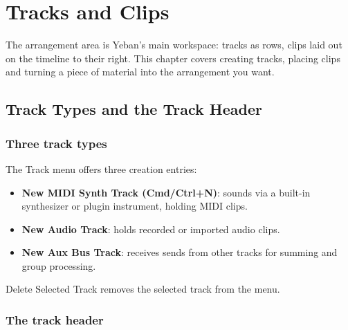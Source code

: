 
\chapter{Tracks and Clips}
\label{ch:tracks-clips}






The arrangement area is Yeban's main workspace: tracks as rows, clips laid out on the
timeline to their right. This chapter covers creating tracks, placing clips and turning
a piece of material into the arrangement you want.

\section{Track Types and the Track Header}

\subsection{Three track types}

The Track menu offers three creation entries:

\begin{itemize}
  \item \textbf{New MIDI Synth Track (Cmd/Ctrl+N)}: sounds via a built-in synthesizer or plugin instrument, holding MIDI clips.
  \item \textbf{New Audio Track}: holds recorded or imported audio clips.
  \item \textbf{New Aux Bus Track}: receives sends from other tracks for summing and group processing.
\end{itemize}

Delete Selected Track removes the selected track from the menu.

\subsection{The track header}


